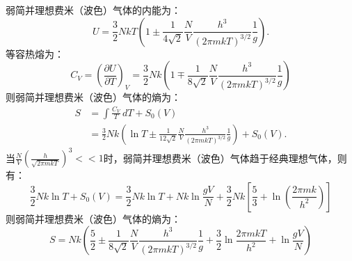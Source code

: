 \documentclass[a4paper,12pt]{article}
\begin{document}
弱简并理想费米（波色）气体的内能为：
\begin{equation*}
	U = \frac{3}{2}NkT\left( 1 \pm \frac{1}{4\sqrt{2}}\frac{N}{V} \frac{h^3}{(2\pi m kT)^{3/2}} \frac{1}{g} \right).
\end{equation*}
等容热熔为：
\begin{equation*}
	C_V = \left( \frac{\partial U}{\partial T} \right)_V = \frac{3}{2}Nk \left( 1 \mp \frac{1}{8\sqrt{2}}\frac{N}{V}\frac{h^3}{(2\pi mkT)^{3/2}} \frac{1}{g} \right)
\end{equation*}
则弱简并理想费米（波色）气体的熵为：
\begin{equation*}
\begin{aligned}
	S &= \int \frac{C_V}{T}\,dT + S_0(V) \\
	&= \frac{3}{2}Nk\left( \ln T \pm \frac{1}{12\sqrt{2}} \frac{N}{V} \frac{h^3}{(2\pi mkT)^{3/2}} \frac{1}{g} \right) + S_0(V).
\end{aligned}
\end{equation*}
当$\frac{N}{V}\left( \frac{h}{\sqrt{2\pi mkT}} \right)^3 << 1$时，弱简并理想费米（波色）气体趋于经典理想气体，则有：
\begin{equation*}
	\frac{3}{2}Nk\ln T + S_0(V) = \frac{3}{2}Nk\ln T + Nk\ln \frac{gV}{N} + \frac{3}{2}Nk \left[ \frac{5}{3} + \ln\left( \frac{2\pi mk}{h^2} \right) \right]
\end{equation*}
则弱简并理想费米（波色）气体的熵为：
\begin{equation*}
	S = Nk\left( \frac{5}{2} \pm \frac{1}{8\sqrt{2}}\frac{N}{V}\frac{h^3}{(2\pi mkT)^{3/2}}\frac{1}{g} + \frac{3}{2}\ln \frac{2\pi mkT}{h^2} + \ln \frac{gV}{N} \right)
\end{equation*}
\end{document}

